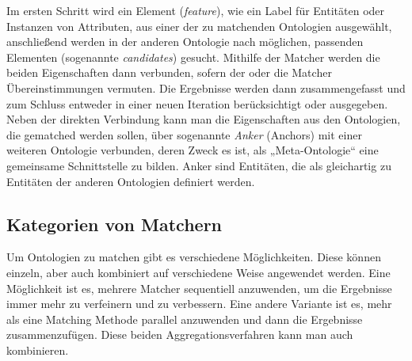 		Im ersten Schritt wird ein Element (\textit{feature}), wie ein Label für
		Entitäten oder Instanzen von Attributen, aus einer der zu matchenden Ontologien ausgewählt,
		anschließend werden in der anderen Ontologie nach möglichen, passenden
		Elementen (sogenannte \textit{candidates}) gesucht. Mithilfe der Matcher werden
		die beiden Eigenschaften dann verbunden, sofern der oder die Matcher Übereinstimmungen vermuten. Die Ergebnisse werden dann zusammengefasst und zum Schluss entweder in einer neuen Iteration berücksichtigt oder ausgegeben. \cite{Hoo14}\\
		Neben der direkten Verbindung kann man die Eigenschaften aus den Ontologien, die
		gematched werden sollen, über sogenannte \textit{Anker} (Anchors) mit einer
		weiteren Ontologie verbunden, deren Zweck es ist, als „Meta-Ontologie“ eine gemeinsame Schnittstelle zu bilden. Anker sind Entitäten, die als gleichartig zu Entitäten der anderen Ontologien definiert werden. \cite{Hoo14}
		
		\subsection{Kategorien von Matchern}
		Um Ontologien zu matchen gibt es verschiedene Möglichkeiten. Diese können einzeln, aber auch kombiniert auf verschiedene Weise angewendet werden. Eine Möglichkeit ist es, mehrere Matcher sequentiell anzuwenden, um die Ergebnisse immer mehr zu verfeinern und zu verbessern. Eine andere Variante ist es, mehr als eine Matching Methode parallel anzuwenden und dann die Ergebnisse zusammenzufügen. Diese beiden Aggregationsverfahren kann man auch kombinieren. \cite{Hoo14}
		
